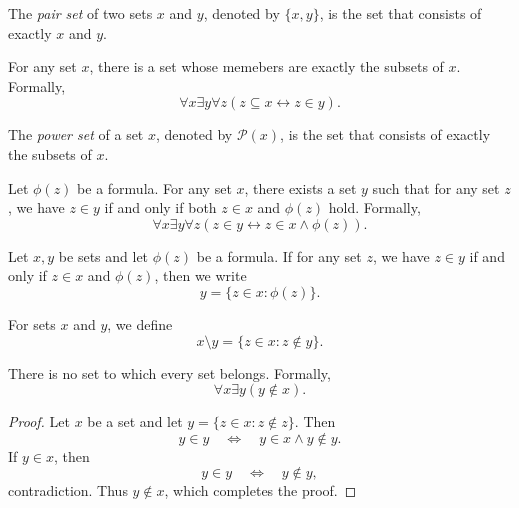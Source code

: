 \begin{definition}
  The \emph{pair set} of two sets $x$ and $y$, denoted by $\{x, y\}$, is the
  set that consists of exactly $x$ and $y$.
\end{definition}

\begin{axiom}
  For any set $x$, there is a set whose memebers are exactly the subsets
  of $x$.
  Formally,
  \begin{equation*}
    \forall x \exists y \forall z (z \subseteq x \leftrightarrow z \in y).
  \end{equation*}
\end{axiom}

\begin{definition}
  The \emph{power set} of a set $x$, denoted by $\mathcal{P}(x)$, is the set
  that consists of exactly the subsets of $x$.
\end{definition}

\begin{axiom}
  Let $\phi(z)$ be a formula.
  For any set $x$, there exists a set $y$ such that for any set $z$, we have
  $z \in y$ if and only if both $z \in x$ and $\phi(z)$ hold.
  Formally,
  \begin{equation*}
    \forall x \exists y \forall z (z \in y \leftrightarrow z \in x \wedge
    \phi(z)).
  \end{equation*}
\end{axiom}

\begin{definition}
  Let $x, y$ be sets and let $\phi(z)$ be a formula.
  If for any set $z$, we have $z \in y$ if and only if $z \in x$ and $\phi(z)$,
  then we write
  \begin{equation*}
    y = \{z \in x: \phi(z)\}.
  \end{equation*}
\end{definition}

\begin{definition}
  For sets $x$ and $y$, we define
  \begin{equation*}
    x \setminus y = \{z \in x: z \notin y\}.
  \end{equation*}
\end{definition}

\begin{theorem}
  There is no set to which every set belongs.
  Formally,
  \begin{equation*}
    \forall x \exists y (y \notin x).
  \end{equation*}
\end{theorem}
\begin{proof}
  Let $x$ be a set and let $y = \{z \in x: z \notin z\}$.
  Then
  \begin{equation*}
    y \in y
    \quad \Leftrightarrow \quad
    y \in x \wedge y \notin y.
  \end{equation*}
  If $y \in x$, then
  \begin{equation*}
    y \in y \quad \Leftrightarrow \quad y \notin y,
  \end{equation*}
  contradiction.
  Thus $y \notin x$, which completes the proof.
\end{proof}

